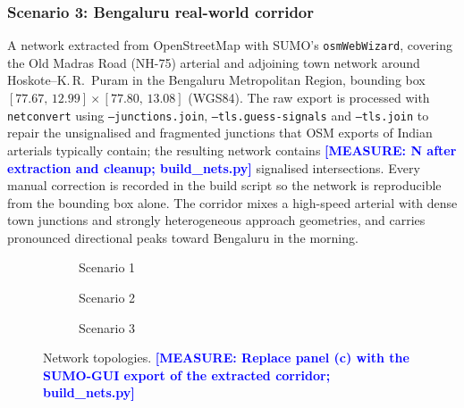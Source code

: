 \documentclass[journal]{IEEEtran}
\newcommand{\note}[1]{\textcolor{blue}{\textbf{[MEASURE: #1]}}}
\begin{document}
\subsubsection{Scenario 3: Bengaluru real-world corridor}
A network extracted from OpenStreetMap with SUMO's
\texttt{osmWebWizard}, covering the Old Madras Road (NH-75) arterial and
adjoining town network around Hoskote--K.\,R.~Puram in the Bengaluru
Metropolitan Region, bounding box
$[77.67,\,12.99] \times [77.80,\,13.08]$ (WGS84). The raw export is
processed with \texttt{netconvert} using
\texttt{--junctions.join}, \texttt{--tls.guess-signals} and
\texttt{--tls.join} to repair the unsignalised and fragmented junctions
that OSM exports of Indian arterials typically contain; the resulting
network contains \note{N after extraction and cleanup;
build\_nets.py} signalised intersections. Every manual correction is
recorded in the build script so the network is reproducible from the
bounding box alone. The corridor mixes a high-speed arterial with dense
town junctions and strongly heterogeneous approach geometries, and
carries pronounced directional peaks toward Bengaluru in the morning.

\begin{figure}[htbp]
\centering
\begin{subfigure}[b]{0.14\textwidth}
\centering
{}
\caption{Scenario 1}
\end{subfigure}
\hfill
\begin{subfigure}[b]{0.15\textwidth}
\centering
{}
\caption{Scenario 2}
\end{subfigure}
\hfill
\begin{subfigure}[b]{0.14\textwidth}
\centering
{}
\caption{Scenario 3}
\end{subfigure}
\caption{Network topologies. \note{Replace panel (c) with the SUMO-GUI
export of the extracted corridor; build\_nets.py}}
\label{fig:topologies}
\end{figure}
\end{document}
